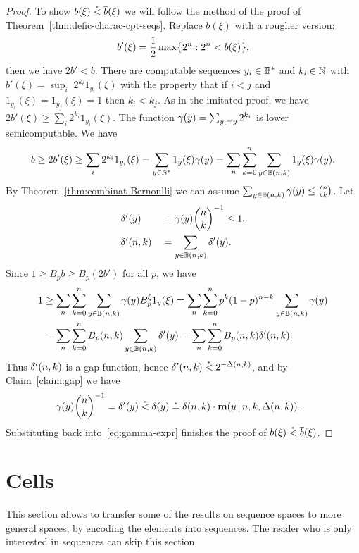 \begin{proof}
To show \( b(\xi)\stackrel{{}_*}{<} \overline{b}(\xi) \) we will
follow the method of the proof of
Theorem~\ref{thm:defic-charac-cpt-seqs}.
Replace \( b(\xi) \) with a rougher version:
 \[
 b'(\xi) = \frac{1}{2}\max \mathopen\{\mskip 1mu2^{n} : 2^{n} < b(\xi)\mskip 1mu\mathclose\},
 \]
then we have \( 2 b'<b \).
There are computable sequences \( y_{i}\in\mathbb{B}^{*} \) and \( k_{i} \in \mathbb{N} \) with
\( b'(\xi) = \sup_{i}\; 2^{k_{i}} 1_{y_{i}}(\xi) \)
with the property that if \( i<j \) and \( 1_{y_{i}}(\xi)=1_{y_{j}}(\xi)=1 \) then
\( k_{i}<k_{j} \).
As in the imitated proof, we have
\( 2b'(\xi) \ge \sum_{i} 2^{k_{i}} 1_{y_{i}}(\xi) \).
The function \( \gamma(y)=\sum_{y_{i}=y}2^{k_{i}} \) is lower semicomputable.
We have
\begin{align}
 b\ge 2b'(\xi)\ge\sum_{i} 2^{k_{i}} 1_{y_{i}}(\xi)  = \sum_{y\in\mathbb{N}^{*}}1_{y}(\xi)\gamma(y)
 = \sum_{n}\sum_{k=0}^{n}\sum_{y\in\mathbb{B}(n,k)}1_{y}(\xi)\gamma(y).
\label{eq:gamma-expr}
 \end{align}
By Theorem~\ref{thm:combinat-Bernoulli} we can assume
\( \sum_{y\in\mathbb{B}(n,k)}\gamma(y)\le \binom{n}{k} \).
Let
 \begin{alignat*}{3}
           &\delta'(y)    &&= \gamma(y)\binom{n}{k}^{-1} \le 1,
\\      &\delta'(n,k) &&=  \sum_{y\in\mathbb{B}(n,k)}\delta'(y).
 \end{alignat*}
Since \( 1\ge B_{p}b \ge B_{p}(2 b') \) for all \( p \), we have 
 \begin{align*}
      1 &\ge \sum_{n}\sum_{k=0}^{n}\sum_{y\in\mathbb{B}(n,k)}\gamma(y)B_{p}^{\xi}1_{y}(\xi)
            = \sum_{n}\sum_{k=0}^{n}p^{k}(1-p)^{n-k}\sum_{y\in\mathbb{B}(n,k)}\gamma(y)
\\     &= \sum_{n}\sum_{k=0}^{n}B_{p}(n,k)\sum_{y\in\mathbb{B}(n,k)}\delta'(y)
          = \sum_{n}\sum_{k=0}^{n}B_{p}(n,k)\delta'(n,k).
 \end{align*}
Thus \( \delta'(n,k) \) is a gap function, hence \( \delta'(n,k) \stackrel{{}_*}{<} 2^{-\Delta(n,k)} \),
and by Claim~\ref{claim:gap} we have 
 \begin{align*}
 \gamma(y)\binom{n}{k}^{-1}&=\delta'(y)\stackrel{{}_*}{<} \delta(y)
   \stackrel{{}_*}{=}\delta(n,k)\cdot\mathbf{m}(y\,\vert\, n,k,\Delta(n,k)).
 \end{align*}
Substituting back into~\eqref{eq:gamma-expr} finishes the proof of
\( b(\xi)\stackrel{{}_*}{<} \overline{b}(\xi) \).
 \end{proof}


\section{Cells}\label{subsec:cells}

This section allows to transfer some of the results
on sequence spaces to more general spaces, by encoding the elements into
sequences.
The reader who is only interested in sequences can skip this section.

